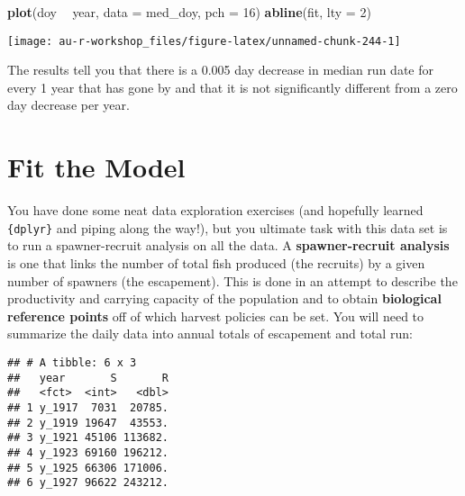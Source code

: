 \documentclass[]{book}
\newenvironment{Shaded}{\begin{snugshade}}{\end{snugshade}}
\newcommand{\KeywordTok}[1]{\textcolor[rgb]{0.13,0.29,0.53}{\textbf{#1}}}
\newcommand{\DataTypeTok}[1]{\textcolor[rgb]{0.13,0.29,0.53}{#1}}
\newcommand{\DecValTok}[1]{\textcolor[rgb]{0.00,0.00,0.81}{#1}}
\newcommand{\StringTok}[1]{\textcolor[rgb]{0.31,0.60,0.02}{#1}}
\newcommand{\OperatorTok}[1]{\textcolor[rgb]{0.81,0.36,0.00}{\textbf{#1}}}
\newcommand{\NormalTok}[1]{#1}
\theoremstyle{definition}
\theoremstyle{definition}
\theoremstyle{definition}
\theoremstyle{remark}
\begin{document}
\begin{Shaded}
\begin{Highlighting}[]
\KeywordTok{plot}\NormalTok{(doy }\OperatorTok{~}\StringTok{ }\NormalTok{year, }\DataTypeTok{data =}\NormalTok{ med_doy, }\DataTypeTok{pch =} \DecValTok{16}\NormalTok{)}
\KeywordTok{abline}\NormalTok{(fit, }\DataTypeTok{lty =} \DecValTok{2}\NormalTok{)}
\end{Highlighting}
\end{Shaded}

\begin{center}\texttt{[image: au-r-workshop\_files/figure-latex/unnamed-chunk-244-1]} \end{center}

The results tell you that there is a 0.005 day decrease in median run
date for every 1 year that has gone by and that it is not significantly
different from a zero day decrease per year.

\section{Fit the Model}\label{fit-the-model}

You have done some neat data exploration exercises (and hopefully
learned \texttt{\{dplyr\}} and piping along the way!), but you ultimate
task with this data set is to run a spawner-recruit analysis on all the
data. A \textbf{spawner-recruit analysis} is one that links the number
of total fish produced (the recruits) by a given number of spawners (the
escapement). This is done in an attempt to describe the productivity and
carrying capacity of the population and to obtain \textbf{biological
reference points} off of which harvest policies can be set. You will
need to summarize the daily data into annual totals of escapement and
total run:

\begin{Shaded}
\end{Shaded}

\begin{verbatim}
## # A tibble: 6 x 3
##   year       S       R
##   <fct>  <int>   <dbl>
## 1 y_1917  7031  20785.
## 2 y_1919 19647  43553.
## 3 y_1921 45106 113682.
## 4 y_1923 69160 196212.
## 5 y_1925 66306 171006.
## 6 y_1927 96622 243212.
\end{verbatim}
\end{document}
